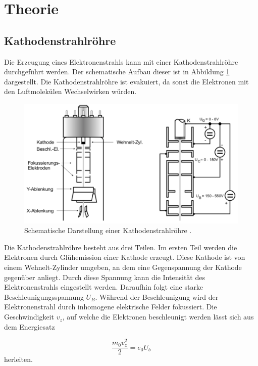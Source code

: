 \section{Theorie}

\subsection{Kathodenstrahlröhre}

Die Erzeugung eines Elektronenstrahls kann mit einer
Kathodenstrahlröhre durchgeführt werden. Der schematische Aufbau dieser ist in
Abbildung \ref{abb:1} dargestellt. Die Kathodenstrahlröhre ist evakuiert, da sonst
die Elektronen mit den Luftmolekülen Wechselwirken würden.

\begin{figure}[H]
  \centering
  \includegraphics[width=\textwidth]{content/Kathode.png}
  \caption{Schematische Darstellung einer Kathodenstrahlröhre \cite{1}.}
  \label{abb:1}
\end{figure}

Die Kathodenstrahlröhre besteht aus drei Teilen.
Im ersten Teil werden die Elektronen durch Glühemission einer Kathode erzeugt.
Diese Kathode ist von einem Wehnelt-Zylinder umgeben, an dem eine Gegenspannung
der Kathode gegenüber anliegt. Durch diese Spannung kann die Intensität des Elektronenstrahls
eingestellt werden. Daraufhin folgt eine starke Beschleunigungsspannung $U_B$. Während
der Beschleunigung wird der Elektronenstrahl durch inhomogene elektrische Felder fokussiert.
Die Geschwindigkeit $v_z$, auf welche die Elektronen beschleunigt werden lässt sich aus dem
Energiesatz

\begin{equation}
  \frac{m_0 v_z^2}{2} = e_0 U_b
  \label{lala}
\end{equation}
herleiten.

